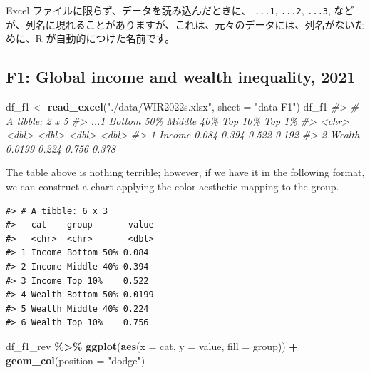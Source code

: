 \documentclass[
  xelatex, ja=standard]{bxjsbook}
\newenvironment{Shaded}{\begin{snugshade}}{\end{snugshade}}
\newcommand{\AttributeTok}[1]{\textcolor[rgb]{0.13,0.29,0.53}{#1}}
\newcommand{\CommentTok}[1]{\textcolor[rgb]{0.56,0.35,0.01}{\textit{#1}}}
\newcommand{\FunctionTok}[1]{\textcolor[rgb]{0.13,0.29,0.53}{\textbf{#1}}}
\newcommand{\NormalTok}[1]{#1}
\newcommand{\OtherTok}[1]{\textcolor[rgb]{0.56,0.35,0.01}{#1}}
\newcommand{\SpecialCharTok}[1]{\textcolor[rgb]{0.81,0.36,0.00}{\textbf{#1}}}
\newcommand{\StringTok}[1]{\textcolor[rgb]{0.31,0.60,0.02}{#1}}
\theoremstyle{definition}
\theoremstyle{definition}
\theoremstyle{definition}
\theoremstyle{definition}
\theoremstyle{remark}
\begin{document}
Excel ファイルに限らず、データを読み込んだときに、 \texttt{...1}, \texttt{...2}, \texttt{...3}, などが、列名に現れることがありますが、これは、元々のデータには、列名がないために、R が自動的につけた名前です。

\hypertarget{f1-global-income-and-wealth-inequality-2021}{%
\subsection{F1: Global income and wealth inequality, 2021}\label{f1-global-income-and-wealth-inequality-2021}}

\begin{Shaded}
\begin{Highlighting}[]
\NormalTok{df\_f1 }\OtherTok{\textless{}{-}} \FunctionTok{read\_excel}\NormalTok{(}\StringTok{"./data/WIR2022s.xlsx"}\NormalTok{, }\AttributeTok{sheet =} \StringTok{"data{-}F1"}\NormalTok{)}
\NormalTok{df\_f1}
\CommentTok{\#\textgreater{} \# A tibble: 2 x 5}
\CommentTok{\#\textgreater{}   ...1   \textasciigrave{}Bottom 50\%\textasciigrave{} \textasciigrave{}Middle 40\%\textasciigrave{} \textasciigrave{}Top 10\%\textasciigrave{} \textasciigrave{}Top 1\%\textasciigrave{}}
\CommentTok{\#\textgreater{}   \textless{}chr\textgreater{}         \textless{}dbl\textgreater{}        \textless{}dbl\textgreater{}     \textless{}dbl\textgreater{}    \textless{}dbl\textgreater{}}
\CommentTok{\#\textgreater{} 1 Income       0.084         0.394     0.522    0.192}
\CommentTok{\#\textgreater{} 2 Wealth       0.0199        0.224     0.756    0.378}
\end{Highlighting}
\end{Shaded}

The table above is nothing terrible; however, if we have it in the following format, we can construct a chart applying the color aesthetic mapping to the group.

\begin{verbatim}
#> # A tibble: 6 x 3
#>   cat    group       value
#>   <chr>  <chr>       <dbl>
#> 1 Income Bottom 50% 0.084 
#> 2 Income Middle 40% 0.394 
#> 3 Income Top 10%    0.522 
#> 4 Wealth Bottom 50% 0.0199
#> 5 Wealth Middle 40% 0.224 
#> 6 Wealth Top 10%    0.756
\end{verbatim}

\begin{Shaded}
\begin{Highlighting}[]
\NormalTok{df\_f1\_rev }\SpecialCharTok{\%\textgreater{}\%}
  \FunctionTok{ggplot}\NormalTok{(}\FunctionTok{aes}\NormalTok{(}\AttributeTok{x =}\NormalTok{ cat, }\AttributeTok{y =}\NormalTok{ value, }\AttributeTok{fill =}\NormalTok{ group)) }\SpecialCharTok{+}
  \FunctionTok{geom\_col}\NormalTok{(}\AttributeTok{position =} \StringTok{"dodge"}\NormalTok{)}
\end{Highlighting}
\end{Shaded}
\end{document}
